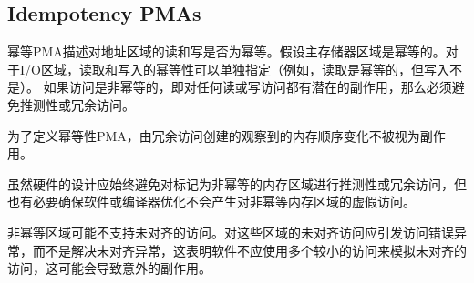 {\subsection{Idempotency PMAs}

\iffalse
Idempotency PMAs describe whether reads and writes to an address
region are idempotent.  Main memory regions are assumed to be
idempotent.  For I/O regions, idempotency on reads and writes can be
specified separately (e.g., reads are idempotent but writes are not).
If accesses are non-idempotent, i.e., there is potentially a side
effect on any read or write access, then speculative or redundant
accesses must be avoided.
\fi
幂等PMA描述对地址区域的读和写是否为幂等。假设主存储器区域是幂等的。对于I/O区域，读取和写入的幂等性可以单独指定（例如，读取是幂等的，但写入不是）。
如果访问是非幂等的，即对任何读或写访问都有潜在的副作用，那么必须避免推测性或冗余访问。

\iffalse
For the purposes of defining the idempotency PMAs, changes in observed
memory ordering created by redundant accesses are not considered a
side effect.
\fi
为了定义幂等性PMA，由冗余访问创建的观察到的内存顺序变化不被视为副作用。

\iffalse
\begin{commentary}
While hardware should always be designed to avoid speculative or
redundant accesses to memory regions marked as non-idempotent, it is
also necessary to ensure software or compiler optimizations do not
generate spurious accesses to non-idempotent memory regions.
\end{commentary}
\fi
\begin{commentary}
虽然硬件的设计应始终避免对标记为非幂等的内存区域进行推测性或冗余访问，但也有必要确保软件或编译器优化不会产生对非幂等内存区域的虚假访问。
\end{commentary}

\iffalse
\begin{commentary}
Non-idempotent regions might not support misaligned accesses.  Misaligned
accesses to such regions should raise access-fault exceptions rather than
address-misaligned exceptions, indicating that software should not emulate the
misaligned access using multiple smaller accesses, which could cause
unexpected side effects.
\end{commentary}
\fi
\begin{commentary}
非幂等区域可能不支持未对齐的访问。对这些区域的未对齐访问应引发访问错误异常，而不是解决未对齐异常，这表明软件不应使用多个较小的访问来模拟未对齐的访问，这可能会导致意外的副作用。
\end{commentary}

}
